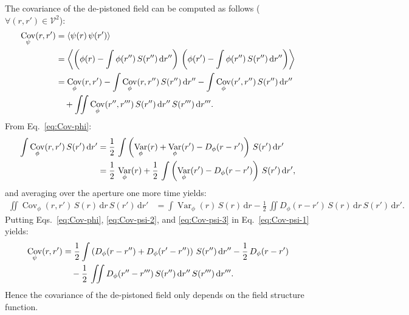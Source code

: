 \documentclass{article}
\DeclareMathOperator{\Var}{Var}
\DeclareMathOperator{\Cov}{Cov}
\begin{document}
The covariance of the de-pistoned field can be computed as follows
($\forall (r,r') \in \mathcal{V}^{2}$):
\begin{align}
  \Cov_{\psi}(r,r')
  &= \langle\psi(r)\,\psi(r')\rangle \notag \\
  &= \left\langle\left(\phi(r) - \int \phi(r'')\,S(r'')\,\mathrm{d}r''\right)\,
    \left(\phi(r') - \int \phi(r'')\,S(r'')\,\mathrm{d}r''\right)\right\rangle \notag \\
  &= \Cov_{\phi}(r,r')
    - \int \Cov_{\phi}(r,r'')\,S(r'')\,\mathrm{d}r''
    - \int \Cov_{\phi}(r',r'')\,S(r'')\,\mathrm{d}r'' \notag\\
  &\quad + \iint \Cov_{\phi}(r'',r''')\,S(r'')\,\mathrm{d}r''\,S(r''')\,\mathrm{d}r'''.
    \label{eq:Cov-psi-1}
\end{align}
From Eq.~\eqref{eq:Cov-phi}:
\begin{align}
  \int \Cov_{\phi}(r,r')\,S(r')\,\mathrm{d}r'
  &= \frac{1}{2}\,\int \left(
    \Var_{\phi}(r) + \Var_{\phi}(r') - D_{\phi}(r - r')
    \right)\,S(r')\,\mathrm{d}r'\notag\\
  &= \frac{1}{2}\,\Var_{\phi}(r)
    + \frac{1}{2}\,\int \left(
    \Var_{\phi}(r') - D_{\phi}(r - r')\right)\,S(r')\,\mathrm{d}r',
    \label{eq:Cov-psi-2}
\end{align}
and averaging over the aperture one more time yields:
\begin{align}
  \iint \Cov_{\phi}(r,r')\,S(r)\,\mathrm{d}r\,S(r')\,\mathrm{d}r'
  &= \int \Var_{\phi}(r)\,S(r)\,\mathrm{d}r
  - \frac{1}{2}\,\iint D_{\phi}(r - r')\,S(r)\,\mathrm{d}r\,S(r')\,\mathrm{d}r'.
    \label{eq:Cov-psi-3}
\end{align}
Putting Eqs.~\eqref{eq:Cov-phi}, \eqref{eq:Cov-psi-2}, and \eqref{eq:Cov-psi-3}
in Eq.~\eqref{eq:Cov-psi-1} yields:
\begin{align}
  \Cov_{\psi}(r,r')
  &= \frac{1}{2} \int \left(D_{\phi}(r - r'') + D_{\phi}(r' - r'')\right)\,S(r'')\,\mathrm{d}r''
    - \frac{1}{2} \, D_{\phi}(r - r') \notag\\
  &\quad - \frac{1}{2}\,\iint D_{\phi}(r'' - r''')\,S(r'')\,\mathrm{d}r''\,S(r''')\,\mathrm{d}r'''.
    \label{eq:Cov-psi-4}
\end{align}
Hence the covariance of the de-pistoned field only depends on the field
structure function.
\end{document}
